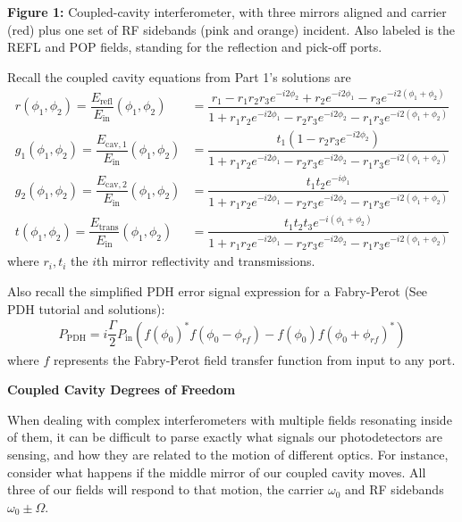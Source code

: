 \documentclass[11pt]{article}
\begin{document}
\noindent \textbf{Figure 1:} Coupled-cavity interferometer, with three mirrors aligned and carrier (red) plus one set of RF sidebands (pink and orange) incident.  
Also labeled is the REFL and POP fields, standing for the reflection and pick-off ports.

Recall the coupled cavity equations from Part 1's solutions are 
\begin{align}
\label{eq:cc_refl}
r(\phi_1,\phi_2) = \dfrac{E_\mathrm{refl}}{E_\mathrm{in}}(\phi_1,\phi_2) &= \dfrac{r_1 - r_1 r_2 r_3 e^{- i 2 \phi_2} + r_2 e^{-i 2 \phi_1} - r_3 e^{-i 2 (\phi_1 + \phi_2)}}{1 + r_1 r_2 e^{-i 2 \phi_1} - r_2 r_3 e^{-i 2 \phi_2} - r_1 r_3 e^{-i 2 (\phi_1 + \phi_2)}}\\
\label{eq:cc_cav1}
g_1(\phi_1,\phi_2) = \dfrac{E_\mathrm{cav,1}}{E_\mathrm{in}}(\phi_1,\phi_2) &= \dfrac{t_1 (1 - r_2 r_3 e^{-i 2 \phi_2}) }{1 + r_1 r_2 e^{-i 2 \phi_1} - r_2 r_3 e^{-i 2 \phi_2} - r_1 r_3 e^{-i 2 (\phi_1 + \phi_2)}}\\
\label{eq:cc_cav2}
g_2(\phi_1,\phi_2) = \dfrac{E_\mathrm{cav,2}}{E_\mathrm{in}}(\phi_1,\phi_2) &= \dfrac{t_1 t_2 e^{-i \phi_1}}{1 + r_1 r_2 e^{-i 2 \phi_1} - r_2 r_3 e^{-i 2 \phi_2} - r_1 r_3 e^{-i 2 (\phi_1 + \phi_2)}}\\
\label{eq:cc_trans}
t(\phi_1,\phi_2) = \dfrac{E_\mathrm{trans}}{E_\mathrm{in}}(\phi_1,\phi_2) &= \dfrac{t_1 t_2 t_3 e^{-i (\phi_1 + \phi_2)}}{1 + r_1 r_2 e^{-i 2 \phi_1} - r_2 r_3 e^{-i 2 \phi_2} - r_1 r_3 e^{-i 2 (\phi_1 + \phi_2)}}
\end{align} 
where $r_i, t_i$ the $i$th mirror reflectivity and transmissions.

Also recall the simplified PDH error signal expression for a Fabry-Perot (See PDH tutorial and solutions):
\begin{align}
    \label{eq:pdh_error}
    P_\mathrm{PDH} = i \dfrac{\Gamma}{2} P_\mathrm{in} \left(f(\phi_0)^* f(\phi_0 - \phi_{rf}) - f(\phi_0) f(\phi_0 + \phi_{rf})^* \right)
\end{align}
where $f$ represents the Fabry-Perot field transfer function from input to any port.

\newpage 
\noindent
\textbf{Coupled Cavity Degrees of Freedom}

When dealing with complex interferometers with multiple fields resonating inside of them, 
it can be difficult to parse exactly what signals our photodetectors are sensing,
and how they are related to the motion of different optics.
For instance, consider what happens if the middle mirror of our coupled cavity moves.
All three of our fields will respond to that motion, the carrier $\omega_0$ and RF sidebands $\omega_0 \pm \Omega$.
\end{document}
